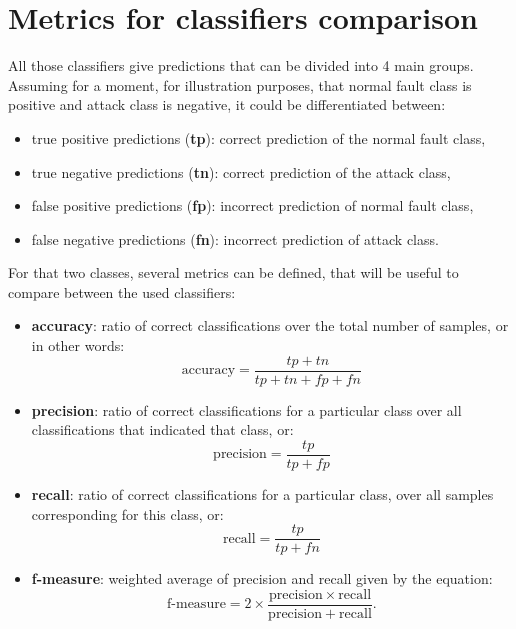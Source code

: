 \section{Metrics for classifiers comparison} \label{sec:metrics}
All those classifiers give predictions that can be divided into 4 main groups. Assuming for a moment, for illustration purposes, that normal fault class is positive and attack class is negative, it could be differentiated between:
\begin{itemize}
    \item true positive predictions (\textbf{tp}): correct prediction of the normal fault class,
    \item true negative predictions (\textbf{tn}): correct prediction of the attack class,
    \item false positive predictions (\textbf{fp}): incorrect prediction of normal fault class,
    \item false negative predictions (\textbf{fn}): incorrect prediction of attack class.
\end{itemize}
For that two classes, several metrics can be defined, that will be useful to compare between the used classifiers: 
\begin{itemize}
    \item \textbf{accuracy}: ratio of correct classifications over the total number of samples, or in other words:
    \begin{equation}
        \text{accuracy} = \frac{tp + tn}{tp + tn + fp + fn}
    \end{equation}
    \item \textbf{precision}:  ratio of correct classifications for a particular class over all classifications that indicated that class, or:
    \begin{equation}
        \text{precision} = \frac{tp}{tp + fp}
    \end{equation}
    \item \textbf{recall}: ratio of correct classifications for a particular class, over all samples corresponding for this class, or:
    \begin{equation}
        \text{recall} = \frac{tp}{tp + fn}
    \end{equation}
    \item \textbf{f-measure}: weighted average of precision and recall given by the equation: 
    \begin{equation*}
        \text{f-measure} = 2 \times \frac{\mathrm{precision} \times \mathrm{recall}}{\mathrm{precision} + \mathrm{recall}}.
    \end{equation*}
\end{itemize}

